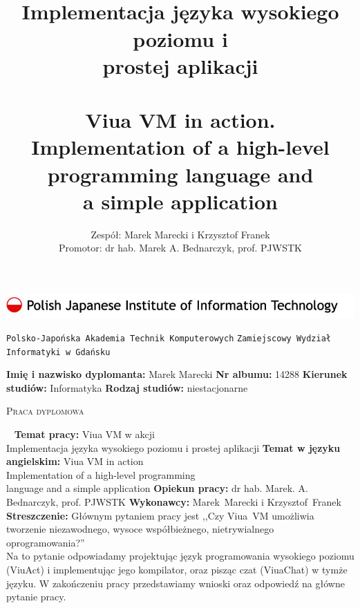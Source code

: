 \documentclass[11pt,oneside,a4paper,titlepage,onecolumn]{book}
\author{Zespół: Marek Marecki i Krzysztof Franek\\Promotor: dr hab. Marek A. Bednarczyk, prof. PJWSTK}
\title{%
    \inzmaintitlePL \\
    \large
    Implementacja języka wysokiego poziomu i \\
    prostej aplikacji\\
    ~\\
    Viua VM in action.\\
    Implementation of a high-level programming language and\\ a simple application}
\newcommand{\inzmaintitlePL}{Viua VM w akcji}
\newcommand{\ViuAct}{ViuAct}
\newcommand{\Dyplomant}{Marek Marecki}
\newcommand{\NumerAlbumu}{14288}
\begin{document}

\begin{titlepage}
    \includegraphics[width=\textwidth]{pjwstk_logo}
    \begin{center}
        {\huge\texttt{Polsko-Japońska Akademia Technik Komputerowych}}
        {\huge\texttt{Zamiejscowy Wydział Informatyki w Gdańsku}}
    \end{center}
    \vspace{1cm}
    {\Large\textbf{Imię i nazwisko dyplomanta:} \Dyplomant}
    \vspace{0.5cm}
    \newline
    {\Large\textbf{Nr albumu:} \NumerAlbumu}
    \vspace{0.5cm}
    \newline
    {\Large\textbf{Kierunek studiów:} Informatyka \hfill \textbf{Rodzaj studiów:} niestacjonarne}

    \vspace{1.5cm}
    \begin{center}
        {\huge\textsc{Praca dyplomowa}}
    \end{center}
    \vspace{1cm}

    ~
    \newline
    {\Large\textbf{Temat pracy:} \inzmaintitlePL\\
         Implementacja języka wysokiego poziomu i
        prostej aplikacji}
    \vspace{1cm}
    \newline
    {\Large\textbf{Temat w języku angielskim:} Viua VM in action\\
         Implementation of a high-level programming\\
         language and a simple application}
    \vspace{1cm}
    \newline
    {\Large\textbf{Opiekun pracy:} dr hab. Marek. A. Bednarczyk, prof. PJWSTK}
    \vspace{0.5cm}
    \newline
    {\Large\textbf{Wykonawcy:} Marek~Marecki i Krzysztof~Franek}
    \vspace{1.5cm}
    \newline
    {\Large\textbf{Streszczenie:} Głównym pytaniem pracy jest ,,Czy Viua~VM
        umożliwia tworzenie niezawodnego, wysoce współbieżnego, nietrywialnego
        oprogramowania?''\\ Na to pytanie odpowiadamy projektując język
        programowania wysokiego poziomu (\ViuAct) i implementując jego
        kompilator, oraz pisząc czat (ViuaChat) w tymże języku. W zakończeniu
        pracy przedstawiamy wnioski oraz odpowiedź na główne pytanie pracy.}


\end{titlepage}
\end{document}
